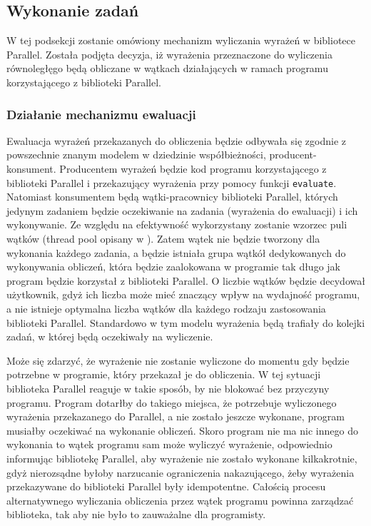 \subsection{Wykonanie zadań}

  W tej podsekcji zostanie omówiony mechanizm wyliczania wyrażeń w bibliotece Parallel.
  Została podjęta decyzja, iż wyrażenia przeznaczone do wyliczenia równoległęgo będą obliczane w wątkach działających w ramach programu korzystającego z biblioteki Parallel.
  
  \subsubsection{Działanie mechanizmu ewaluacji}
  
  Ewaluacja wyrażeń przekazanych do obliczenia będzie odbywała się zgodnie z powszechnie znanym modelem w dziedzinie współbieżności, producent-konsument.
  Producentem wyrażeń będzie kod programu korzystającego z biblioteki Parallel i przekazujący wyrażenia przy pomocy funkcji \texttt{evaluate}.
  Natomiast konsumentem będą wątki-pracownicy biblioteki Parallel, których jedynym zadaniem będzie oczekiwanie na zadania (wyrażenia do ewaluacji) i ich wykonywanie.
  Ze względu na efektywność wykorzystany zostanie wzorzec puli wątków (thread pool opisany w \cite{threadpool}).
  Zatem wątek nie będzie tworzony dla wykonania każdego zadania, a będzie istniała grupa wątkół dedykowanych do wykonywania obliczeń, która będzie zaalokowana w programie tak długo jak program będzie korzystał z biblioteki Parallel.
  O liczbie wątków będzie decydował użytkownik, gdyż ich liczba może mieć znaczący wpływ na wydajność programu, a nie istnieje optymalna liczba wątków dla każdego rodzaju zastosowania biblioteki Parallel.
  Standardowo w tym modelu wyrażenia będą trafiały do kolejki zadań, w której będą oczekiwały na wyliczenie.
  
  Może się zdarzyć, że wyrażenie nie zostanie wyliczone do momentu gdy będzie potrzebne w programie, który przekazał je do obliczenia.
  W tej sytuacji biblioteka Parallel reaguje w takie sposób, by nie blokować bez przyczyny programu.
  Program dotarłby do takiego miejsca, że potrzebuje wyliczonego wyrażenia przekazanego do Parallel, a nie zostało jeszcze wykonane, program musiałby oczekiwać na wykonanie obliczeń.
  Skoro program nie ma nic innego do wykonania to wątek programu sam może wyliczyć wyrażenie, odpowiednio informując bibliotekę Parallel, aby wyrażenie nie zostało wykonane kilkakrotnie, 
  gdyż nierozsądne byłoby narzucanie ograniczenia nakazującego, żeby wyrażenia przekazywane do biblioteki Parallel były idempotentne.
  Całością procesu alternatywnego wyliczania obliczenia przez wątek programu powinna zarządzać biblioteka, tak aby nie było to zauważalne dla programisty.
  
